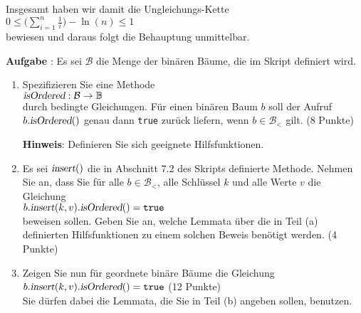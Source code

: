 \documentclass{article}
\newcounter{aufgabe}
\newcommand{\exercise}{\vspace*{0.2cm}
\stepcounter{aufgabe}

\noindent
\textbf{Aufgabe \arabic{aufgabe}}: }
\begin{document}
Insgesamt haben wir damit die Ungleichungs-Kette
\\[0.2cm]
\hspace*{1.3cm}
$0 \leq \biggl(\sum\limits_{i=1}^n \frac{1}{i}\biggr) - \ln(n) \leq 1$
\\[0.2cm]
bewiesen und daraus folgt die Behauptung unmittelbar.

\exercise
Es sei $\mathcal{B}$ die Menge der bin\"aren B\"aume, die im Skript definiert wird.  
\begin{enumerate}
\item Spezifizieren Sie eine Methode \\[0.2cm]
      \hspace*{1.3cm}
      $\textsl{isOrdered}: \mathcal{B} \rightarrow \mathbb{B}$
      \\[0.2cm]
      durch bedingte Gleichungen.  F\"ur einen bin\"aren Baum $b$ soll der Aufruf
      $b.\textsl{isOrdered}()$ genau dann \texttt{true} zur\"uck liefern, wenn $b\in \mathcal{B}_<$
      gilt.
      \hspace*{\fill} (8 Punkte)

      \textbf{Hinweis}: Definieren Sie sich geeignete Hilfsfunktionen.
\item Es sei $\textsl{insert}()$ die in Abschnitt 7.2 des Skripts definierte Methode.
      Nehmen Sie an, dass Sie f\"ur alle $b\in \mathcal{B}_<$, alle Schl\"ussel $k$ und alle Werte
      $v$ die Gleichung
      \\[0.2cm]
      \hspace*{1.3cm} $b.\textsl{insert}(k,v).\textsl{isOrdered}() = \texttt{true}$
      \\[0.2cm]
      beweisen sollen.  Geben Sie an, welche Lemmata \"uber die in Teil (a) definierten
      Hilfsfunktionen zu einem solchen Beweis ben\"otigt werden.
      \hspace*{\fill} (4 Punkte)
\item Zeigen Sie nun f\"ur geordnete bin\"are B\"aume die Gleichung
      \\[0.2cm]
      \hspace*{1.3cm} $b.\textsl{insert}(k,v).\textsl{isOrdered}() = \texttt{true}$ 
      \hspace*{\fill} (12 Punkte)
      \\[0.2cm]
      Sie d\"urfen dabei die Lemmata, die Sie in Teil (b) angeben sollen, benutzen.
\end{enumerate}
\end{document}
